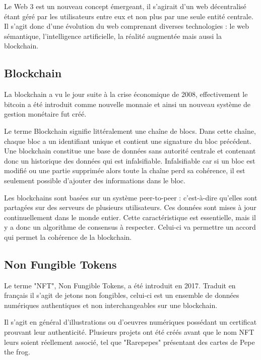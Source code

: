 \documentclass[11pt]{article}
\begin{document}
Le Web 3 est un nouveau concept émergeant, il s'agirait d'un web décentralisé étant géré par les utilisateurs entre eux et non plus par une seule entité centrale. Il s'agit donc d'une évolution du web comprenant diverses technologies : le web sémantique, l'intelligence artificielle, la réalité augmentée mais aussi la blockchain. \cite{korpal_decentralization_2022} \cite{rudman_defining_2016}

\subsection{Blockchain} %
La blockchain a vu le jour suite à la crise économique de 2008, effectivement le bitcoin a été introduit comme nouvelle monnaie et ainsi un nouveau système de gestion monétaire fut créé. 

Le terme Blockchain signifie littéralement une chaîne de blocs. Dans cette chaîne, chaque bloc a un identifiant unique et contient une signature du bloc précédent. Une blockchain constitue une base de données sans autorité centrale et contenant donc un historique des données qui est infalsifiable. 
Infalsifiable car si un bloc est modifié ou une partie supprimée alors toute la chaîne perd sa cohérence, il est seulement possible d'ajouter des informations dans le bloc. \cite{dumas_1_2022} \cite{whitaker_art_2021}

Les blockchains sont basées sur un système peer-to-peer : c'est-à-dire qu'elles sont partagées sur des serveurs de plusieurs utilisateurs. Ces données sont mises à jour continuellement dans le monde entier. Cette caractéristique est essentielle, mais il y a donc un algorithme de consensus à respecter. Celui-ci va permettre un accord qui permet la cohérence de la blockchain. \cite{abbate_blockchain_2022}

\subsection{Non Fungible Tokens} %
Le terme "NFT", Non Fungible Tokens, a été introduit en 2017. Traduit en français il s'agit de jetons non fongibles, celui-ci est un ensemble de données numériques authentiques et non interchangeables sur une blockchain.  

Il s'agit en général d'illustrations ou d'oeuvres numériques possédant un certificat prouvant leur authenticité. Plusieurs projets ont été créés avant que le nom NFT leurs soient réellement associé, tel que "Rarepepes" présentant des cartes de Pepe the frog.  
\end{document}
